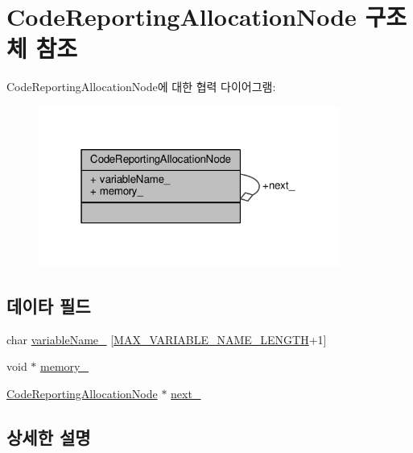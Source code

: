 \hypertarget{struct_code_reporting_allocation_node}{}\section{Code\+Reporting\+Allocation\+Node 구조체 참조}
\label{struct_code_reporting_allocation_node}


Code\+Reporting\+Allocation\+Node에 대한 협력 다이어그램\+:
\nopagebreak
\begin{figure}[H]
\begin{center}
\leavevmode
\includegraphics[width=280pt]{struct_code_reporting_allocation_node__coll__graph}
\end{center}
\end{figure}
\subsection*{데이타 필드}
\begin{DoxyCompactItemize}
\item 
char \hyperlink{struct_code_reporting_allocation_node_ac6f8a20a992369f629ef7f014c8a884e}{variable\+Name\+\_\+} \mbox{[}\hyperlink{_code_memory_report_formatter_8cpp_a390a261795a09db8b3cf37b5942f00bd}{M\+A\+X\+\_\+\+V\+A\+R\+I\+A\+B\+L\+E\+\_\+\+N\+A\+M\+E\+\_\+\+L\+E\+N\+G\+TH}+1\mbox{]}
\item 
void $\ast$ \hyperlink{struct_code_reporting_allocation_node_a2873ecb79916c84dc21bb9a27876a46c}{memory\+\_\+}
\item 
\hyperlink{struct_code_reporting_allocation_node}{Code\+Reporting\+Allocation\+Node} $\ast$ \hyperlink{struct_code_reporting_allocation_node_a8f0c58c5a02860822d947c32e435bd3c}{next\+\_\+}
\end{DoxyCompactItemize}


\subsection{상세한 설명}



